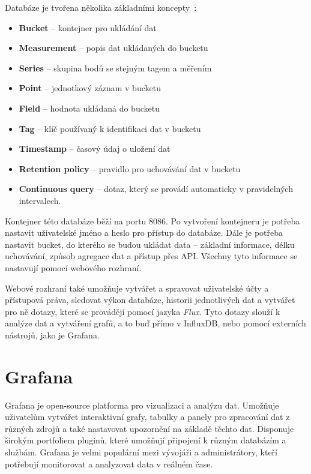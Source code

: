 Databáze je tvořena několika základními koncepty~\cite{InfluxDBKeyConcepts}:
\begin{itemize}
    \item \textbf{Bucket} – kontejner pro ukládání dat
    \item \textbf{Measurement} – popis dat ukládaných do bucketu
    \item \textbf{Series} – skupina bodů se stejným tagem a měřením
    \item \textbf{Point} – jednotkový záznam v bucketu
    \item \textbf{Field} – hodnota ukládaná do bucketu
    \item \textbf{Tag} – klíč používaný k identifikaci dat v bucketu
    \item \textbf{Timestamp} – časový údaj o uložení dat
    \item \textbf{Retention policy} – pravidlo pro uchovávání dat v bucketu
    \item \textbf{Continuous query} – dotaz, který se provádí automaticky v pravidelných intervalech.
\end{itemize}
Kontejner této databáze běží na portu 8086. Po vytvoření kontejneru je potřeba nastavit uživatelské jméno a heslo pro přístup do databáze. Dále je potřeba nastavit bucket, do kterého se budou ukládat data – základní informace, délku uchovávání, způsob agregace dat a přístup přes API. Všechny tyto informace se nastavují pomocí webového rozhraní.

Webové rozhraní také umožňuje vytvářet a spravovat uživatelské účty a přístupová práva, sledovat výkon databáze, historii jednotlivých dat a vytvářet pro ně dotazy, které se provádějí pomocí jazyka \textit{Flux}. Tyto dotazy slouží k analýze dat a vytváření grafů, a to buď přímo v InfluxDB, nebo pomocí externích nástrojů, jako je Grafana. 
\section{Grafana}
Grafana je open-source platforma pro vizualizaci a analýzu dat. Umožňuje uživatelům vytvářet interaktivní grafy, tabulky a panely pro zpracování dat z různých zdrojů a také nastavovat upozornění na základě těchto dat. Disponuje širokým portfoliem pluginů, které umožňují připojení k různým databázím a službám. Grafana je velmi populární mezi vývojáři a administrátory, kteří potřebují monitorovat a analyzovat data v reálném čase. \cite{Grafana} \newline

